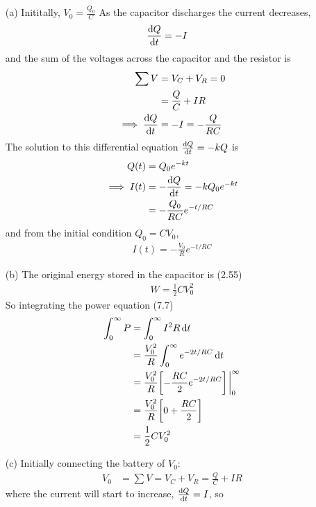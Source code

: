 \documentclass[../main.tex]{subfiles}
\begin{document}
\begin{itemize}
    \item [(a)] Inititally, $V_0 = \frac{Q_0}{C}$ As the capacitor discharges the current decreases,
    \begin{align*}
        \dv{Q}{t} &= -I
    \end{align*}
    and the sum of the voltages across the capacitor and the resistor is
    \begin{align*}
        \sum V &= V_C + V_R = 0 \\
        &= \frac{Q}{C} + IR \\
        \implies \dv{Q}{t} &= -I = -\frac{Q}{RC} \\
    \end{align*}
    The solution to this differential equation $\dv{Q}{t} = -kQ$ is
    \begin{align*}
        Q(t) &= Q_0 e^{-kt} \\
        \implies I(t) &= -\dv{Q}{t} = -kQ_0 e^{-kt} \\
        &= -\frac{Q_0}{RC} e^{-t/RC}
    \end{align*}
    and from the initial condition $Q_0 = CV_0$,
    \begin{align*}
        \boxed{
            I(t) = -\frac{V_0}{R} e^{-t/RC}
        }
    \end{align*}
    \item [(b)] The original energy stored in the capacitor is (2.55)
    \begin{align*}
        \boxed{W = \frac{1}{2} CV_0^2}
    \end{align*}
    So integrating the power equation (7.7)
    \begin{align*}
        \int_0^\infty P &= \int_0^\infty I^2 R \dd{t} \\
        &= \frac{V_0^2}{R} \int_0^\infty e^{-2t/RC} \dd{t} \\
        &= \frac{V_0^2}{R} \qt[
            -\frac{RC}{2} e^{-2t/RC}
        ]\eval_0^\infty \\
        &= \frac{V_0^2}{R} \qt[
            0 + \frac{RC}{2}
        ] \\
        &= \frac{1}{2} CV_0^2
    \end{align*}
    \item [(c)] Initially connecting the battery of $V_0$:
    \begin{align*}
        V_0 &= \sum V = V_C + V_R = \frac{Q}{C} + IR
    \end{align*}
    where the current will start to increase, $\dv{Q}{t} = I$, so

\end{itemize}
\end{document}
